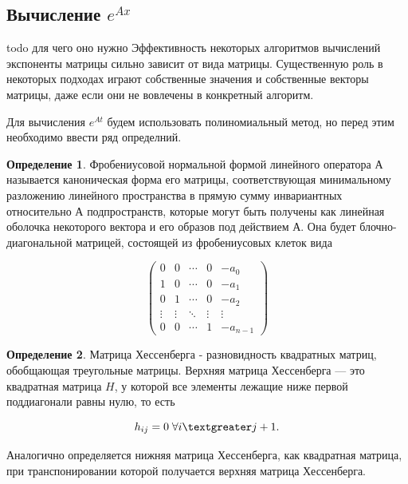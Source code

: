 \documentclass[master, och, diploma, times]{sty/SCWorks}
\theoremstyle{plain}
\theoremstyle{definition}
\newtheorem{defn}{Определение}[section]
\begin{document}
\subsection{Вычисление $e^{Ax}$}

todo для чего оно нужно
Эффективность некоторых алгоритмов вычислений экспоненты
матрицы сильно зависит от вида матрицы. Существенную роль в некоторых подходах играют собственные значения и собственные векторы
матрицы, даже если они не вовлечены в конкретный алгоритм.


Для вычисления $e^{At}$ будем использовать полиномиальный метод, но перед этим необходимо ввести ряд определний.

\begin{defn}
Фробениусовой нормальной формой линейного оператора $А$ называется каноническая форма его матрицы, соответствующая минимальному разложению линейного пространства в прямую сумму инвариантных относительно $А$ подпространств, которые могут быть получены как линейная оболочка некоторого вектора и его образов под действием А. Она будет блочно-диагональной матрицей, состоящей из фробениусовых клеток вида

\begin{equation}
\begin{pmatrix}
0&0&\cdots&0&-a_0\\
1&0&\cdots&0&-a_1\\
0&1&\cdots&0&-a_2\\
\vdots&\vdots&\ddots&\vdots&\vdots\\
0&0&\cdots&1&-a_{n-1}
\end{pmatrix}
\end{equation}

\end{defn}

\begin{defn}
Матрица Хессенберга - разновидность квадратных матриц, обобщающая треугольные матрицы. Верхняя матрица Хессенберга — это квадратная матрица ${\displaystyle H}$, у которой все элементы лежащие ниже первой поддиагонали равны нулю, то есть 

\begin{equation}
h_{ij}=0 \; \forall i \textgreater j+1.	
\end{equation}

\noindent Аналогично определяется нижняя матрица Хессенберга, как квадратная матрица, при транспонировании которой получается верхняя матрица Хессенберга.
\end{defn}
\end{document}
